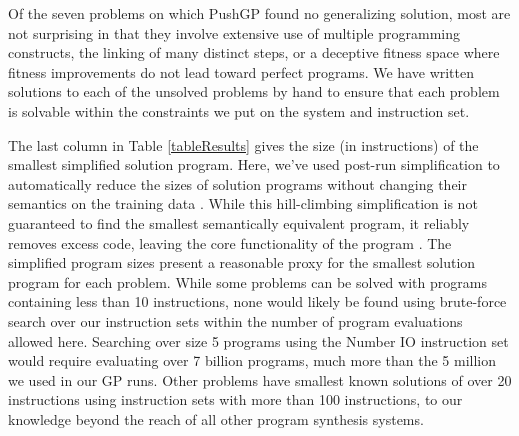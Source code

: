 \documentclass{sig-alternate}
\begin{document}
Of the seven problems on which PushGP found no generalizing solution, most are not surprising in that they involve extensive use of multiple programming constructs, the linking of many distinct steps, or a deceptive fitness space where fitness improvements do not lead toward perfect programs. 
We have written solutions to each of the unsolved problems by hand to ensure that each problem is solvable within the constraints we put on the system and instruction set.


The last column in Table \ref{tableResults} gives the size (in instructions) of the  smallest simplified solution program. Here, we've used post-run simplification to automatically reduce the sizes of solution programs without changing their semantics on the training data \cite{Spector:2014:GECCOcomp}. While this hill-climbing simplification is not guaranteed to find the smallest semantically equivalent program, it reliably removes excess code, leaving the core functionality of the program \cite{Spector:2014:GECCOcomp}. The simplified program sizes present a reasonable proxy for the smallest solution program for each problem. While some problems can be solved with programs containing less than 10 instructions, none would likely be found using brute-force search over our instruction sets within the number of program evaluations allowed here. Searching over size 5 programs using the Number IO instruction set would require evaluating over 7 billion programs, much more than the 5 million we used in our GP runs. Other problems have smallest known solutions of over 20 instructions using instruction sets with more than 100 instructions, to our knowledge beyond the reach of all other program synthesis systems.



\end{document}
